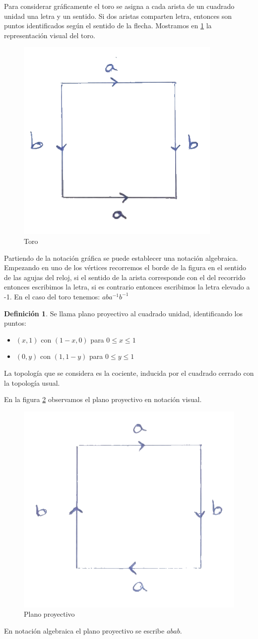 \documentclass[a4paper,11pt,spanish, twoside, leqno]{tfg-uam}
\theoremstyle{definition}
\newtheorem{defin}[teor]{Definici\'on}
\begin{document}
Para considerar gráficamente el toro se asigna a cada arista de un cuadrado unidad una letra y un sentido. Si dos aristas comparten letra, entonces son puntos identificados según el sentido de la flecha. Mostramos en \ref{fig:toro} la representación visual del toro.

\begin{figure}[h]\label{fig:toro}
	\centering
	\includegraphics[width=0.3\linewidth]{imagenes/toro.png}
	\caption{Toro}
\end{figure} 

Partiendo de la notación gráfica se puede establecer una notación algebraica. Empezando en uno de los vértices recorremos el borde de la figura en el sentido de las agujas del reloj, si el sentido  de la arista corresponde con el del recorrido entonces escribimos la letra, si es contrario entonces escribimos la letra elevado a -1. En el caso del toro tenemos: $aba^{-1}b^{-1}$ 



\begin{defin}\label{defin:planoproyectivo}
	Se llama plano proyectivo al cuadrado unidad, identificando los puntos:
	\begin{itemize}
		\item 
		$(x,1)$ con $(1-x,0)$ para $0\leq x\leq 1$
		\item 
		$(0,y)$ con $(1,1-y)$ para $0\leq y\leq 1$
	\end{itemize}
	La topología que se considera es la cociente, inducida por el cuadrado cerrado con la topología usual.
\end{defin}

En la figura \ref{fig:planoproyectivo} observamos el plano proyectivo en notación visual.

\begin{figure}[h]\label{fig:planoproyectivo}
	\centering
	\includegraphics[width=0.3\linewidth]{imagenes/planop.png}
	\caption{Plano proyectivo}
\end{figure} 
En notación algebraica el plano proyectivo se escribe $abab$.
\end{document}
